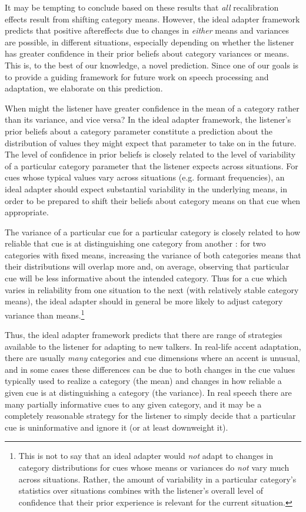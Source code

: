 It may be tempting to conclude based on these results that \emph{all} recalibration effects result from shifting category means.  However, the ideal adapter framework predicts that positive aftereffects due to changes in \emph{either} means and variances are possible, in different situations, especially depending on whether the listener has greater confidence in their prior beliefs about category variances or means. This is, to the best of our knowledge, a novel prediction. Since one of our goals is to provide a guiding framework for future work on speech processing and adaptation, we elaborate on this prediction.

When might the listener have greater confidence in the mean of a category rather than its variance, and vice versa?  
In the ideal adapter framework, the listener's prior beliefs about a category parameter constitute a prediction about the distribution of values they might expect that parameter to take on in the future.  The level of confidence in prior beliefs is closely related to the level of variability of a particular category parameter that the listener expects across situations.  For cues whose typical values vary across situations (e.g. formant frequencies), an ideal adapter should expect substantial variability in the underlying means, in order to be prepared to shift their beliefs about category means on that cue when appropriate.

The variance of a particular cue for a particular category is closely related to how reliable that cue is at distinguishing one category from another \autocite{Allen2004,Clayards2008,Newman2001,Toscano2010}: for two categories with fixed means, increasing the variance of both categories means that their distributions will overlap more and, on average, observing that particular cue will be less informative about the intended category.  Thus for a cue which varies in reliability from one situation to the next (with relatively stable category means), the ideal adapter should in general be more likely to adjust category variance than means.\footnote{This is not to say that an ideal adapter would \emph{not} adapt to changes in category distributions for cues whose means or variances do \emph{not} vary much across situations.
Rather, the amount of variability in a particular category's statistics over situations combines with the listener's overall level of confidence that their prior experience is relevant for the current situation.}

Thus, the ideal adapter framework predicts that there are range of strategies available to the listener for adapting to new talkers.  In real-life accent adaptation, there are usually \emph{many} categories and cue dimensions where an accent is unusual, and in some cases these differences can be due to both changes in the cue values typically used to realize a category (the mean) and changes in how reliable a given cue is at distinguishing a category (the variance).  In real speech there are many partially informative cues to any given category, and it may be a completely reasonable strategy for the listener to simply decide that a particular cue is uninformative and ignore it (or at least downweight it).


